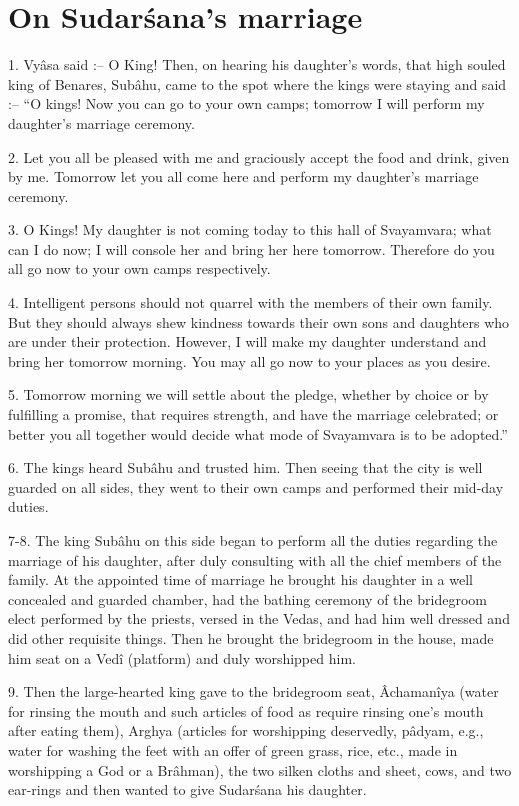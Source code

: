 ﻿\chapter{On Sudar\'sana's marriage}

1. Vy\^asa said :-- O King! Then, on hearing his daughter's words, that high souled king of Benares, Sub\^ahu, came to the spot where the kings were staying and said :-- ``O kings! Now you can go to your own camps; tomorrow I will perform my daughter's marriage ceremony.

2. Let you all be pleased with me and graciously accept the food and drink, given by me. Tomorrow let you all come here and perform my daughter's marriage ceremony.

3. O Kings! My daughter is not coming today to this hall of Svayamvara; what can I do now; I will console her and bring her here tomorrow. Therefore do you all go now to your own camps respectively.

4. Intelligent persons should not quarrel with the members of their own family. But they should always shew kindness towards their own sons and daughters who are under their protection. However, I will make my daughter understand and bring her tomorrow morning. You may all go now to your places as you desire.

5. Tomorrow morning we will settle about the pledge, whether by choice or by fulfilling a promise, that requires strength, and have the marriage celebrated; or better you all together would decide what mode of Svayamvara is to be adopted.''

6. The kings heard Sub\^ahu and trusted him. Then seeing that the city is well guarded on all sides, they went to their own camps and performed their mid-day duties.

7-8. The king Sub\^ahu on this side began to perform all the duties regarding the marriage of his daughter, after duly consulting with all the chief members of the family. At the appointed time of marriage he brought his daughter in a well concealed and guarded chamber, had the bathing ceremony of the bridegroom elect performed by the priests, versed in the Vedas, and had him well dressed and did other requisite things. Then he brought the bridegroom in the house, made him seat on a Ved\^i (platform) and duly worshipped him.

9. Then the large-hearted king gave to the bridegroom seat, Âchaman\^iya (water for rinsing the mouth and such articles of food as require rinsing one's mouth after eating them), Arghya (articles for worshipping deservedly, p\^adyam, e.g., water for washing the feet with an offer of green grass, rice, etc., made in worshipping a God or a Br\^ahman), the two silken cloths and sheet, cows, and two ear-rings and then wanted to give Sudar\'sana his daughter.


